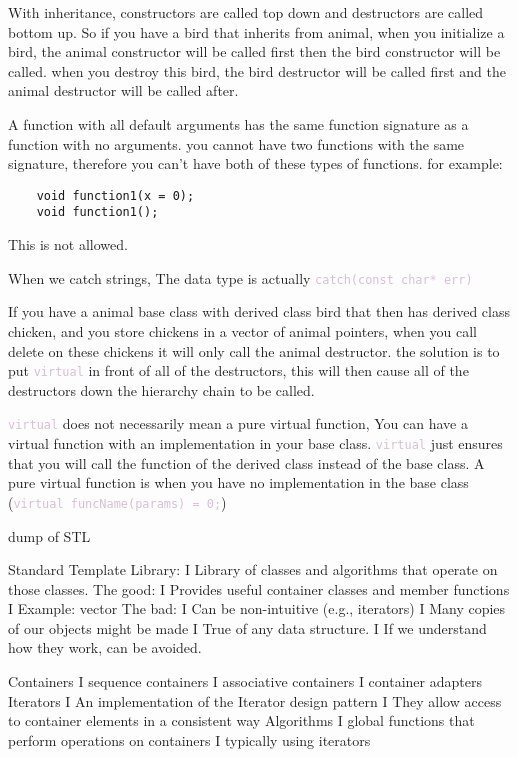 \documentclass{article}
\newcommand{\code}[1]{\textcolor{Thistle}{\texttt{#1}}}
\begin{document}
{With inheritance, constructors are called top down and destructors are called bottom up. So if you have a bird that inherits from animal, when you initialize a bird, the animal constructor will be called first then the bird constructor will be called. when you destroy this bird, the bird destructor will be called first and the animal destructor will be called after.

A function with all default arguments has the same function signature as a function with no arguments. you cannot have two functions with the same signature, therefore you can't have both of these types of functions. for example:
\begin{verbatim}
    void function1(x = 0);
    void function1();
\end{verbatim}
This is not allowed.

When we catch strings, The data type is actually \code{catch(const char* err)}

If you have a animal base class with derived class bird that then has derived class chicken, and you store chickens in a vector of animal pointers, when you call delete on these chickens it will only call the animal destructor. the solution is to put \code{virtual} in front of all of the destructors, this will then cause all of the destructors down the hierarchy chain to be called.

\code{virtual} does not necessarily mean a pure virtual function, You can have a virtual function with an implementation in your base class. \code{virtual} just ensures that you will call the function of the derived class instead of the base class. A pure virtual function is when you have no implementation in the base class (\code{virtual funcName(params) = 0;})


dump of STL

Standard Template Library:
I Library of classes and algorithms that operate on those classes.
The good:
I Provides useful container classes and member functions
I Example: vector
The bad:
I Can be non-intuitive (e.g., iterators)
I Many copies of our objects might be made
I True of any data structure.
I If we understand how they work, can be avoided.


Containers
I sequence containers
I associative containers
I container adapters
Iterators
I An implementation of the Iterator design pattern
I They allow access to container elements in a consistent way
Algorithms
I global functions that perform operations on containers
I typically using iterators


}
\end{document}
